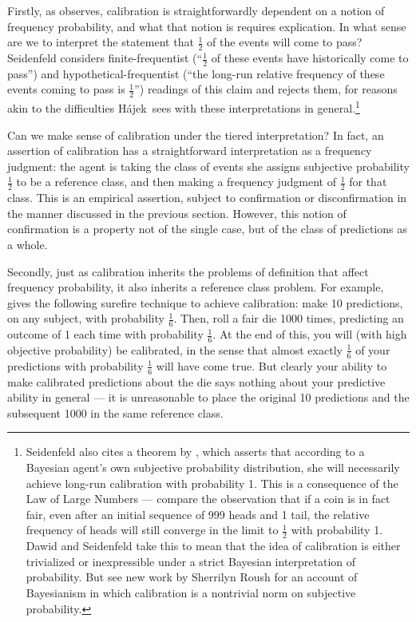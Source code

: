 \documentclass[letterpaper,12pt]{article}
\newcommand{\hajek}{H\'ajek}
\begin{document}
Firstly, as \cite{Seidenfeld1985-SEICCA} observes, calibration is straightforwardly dependent on a notion of frequency probability, and what that notion is requires explication. In what sense are we to interpret the statement that $\frac{1}{2}$ of the events will come to pass? Seidenfeld considers finite-frequentist (``$\frac{1}{2}$ of these events have historically come to pass'') and hypothetical-frequentist (``the long-run relative frequency of these events coming to pass is $\frac{1}{2}$'') readings of this claim and rejects them, for reasons akin to the difficulties \hajek\ sees with these interpretations in general.\footnote{Seidenfeld also cites a theorem by \cite{dawid1982well}, which asserts that according to a Bayesian agent's own subjective probability distribution, she will necessarily achieve long-run calibration with probability 1. This is a consequence of the Law of Large Numbers --- compare the observation that if a coin is in fact fair, even after an initial sequence of 999 heads and 1 tail, the relative frequency of heads will still converge in the limit to $\frac{1}{2}$ with probability 1. Dawid and Seidenfeld take this to mean that the idea of calibration is either trivialized or inexpressible under a strict Bayesian interpretation of probability. But see new work by Sherrilyn Roush for an account of Bayesianism in which calibration is a nontrivial norm on subjective probability.}

Can we make sense of calibration under the tiered interpretation? In fact, an assertion of calibration has a straightforward interpretation as a frequency judgment: the agent is taking the class of events she assigns subjective probability $\frac{1}{2}$ to be a reference class, and then making a frequency judgment of $\frac{1}{2}$ for that class. This is an empirical assertion, subject to confirmation or disconfirmation in the manner discussed in the previous section. However, this notion of confirmation is a property not of the single case, but of the class of predictions as a whole.

Secondly, just as calibration inherits the problems of definition that affect frequency probability, it also inherits a reference class problem. For example, \cite{vanFraassen1983-VANCAF-2} gives the following surefire technique to achieve calibration: make 10 predictions, on any subject, with probability $\frac{1}{6}$. Then, roll a fair die 1000 times, predicting an outcome of 1 each time with probability $\frac{1}{6}$. At the end of this, you will (with high objective probability) be calibrated, in the sense that almost exactly $\frac{1}{6}$ of your predictions with probability $\frac{1}{6}$ will have come true. But clearly your ability to make calibrated predictions about the die says nothing about your predictive ability in general --- it is unreasonable to place the original 10 predictions and the subsequent 1000 in the same reference class.
\end{document}

